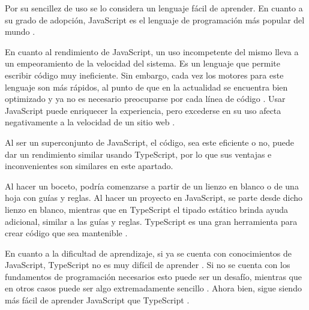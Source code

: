 \documentclass{article}
\begin{document}
Por su sencillez de uso se lo considera un lenguaje fácil de aprender. En cuanto a su grado de adopción, JavaScript es el lenguaje de programación más popular del mundo \parencite{w3schoolsJs}. 

En cuanto al rendimiento de JavaScript, un uso incompetente del mismo lleva a un empeoramiento de la velocidad del sistema. Es un lenguaje que permite escribir código muy ineficiente. Sin embargo, cada vez los motores para este lenguaje son más rápidos, al punto de que en la actualidad se encuentra bien optimizado y ya no es necesario preocuparse por cada línea de código \parencite{arturWojnar}. Usar JavaScript puede enriquecer la experiencia, pero excederse en su uso afecta negativamente a la velocidad de un sitio web \parencite{timVanSchie}.

Al ser un superconjunto de JavaScript, el código, sea este eficiente o no, puede dar un rendimiento similar usando TypeScript, por lo que sus ventajas e inconvenientes son similares en este apartado.

Al hacer un boceto, podría comenzarse a partir de un lienzo en blanco o de una hoja con guías y reglas. Al hacer un proyecto en JavaScript, se parte desde dicho lienzo en blanco, mientras que en TypeScript el tipado estático brinda ayuda adicional, similar a las guías y reglas. TypeScript es una gran herramienta para crear código que sea mantenible \parencite{hao}. 

En cuanto a la dificultad de aprendizaje, si ya se cuenta con conocimientos de JavaScript, TypeScript no es muy difícil de aprender \parencite{freecodecampTs}. Si no se cuenta con los fundamentos de programación necesarios esto puede ser un desafío, mientras que en otros casos puede ser algo extremadamente sencillo \parencite{thecodebytes}. Ahora bien, sigue siendo más fácil de aprender JavaScript que TypeScript \parencite{isJsHardToLearn}.
\end{document}
